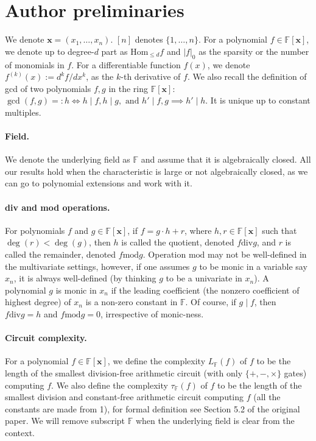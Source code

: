 \section*{Author preliminaries}
We denote $\mathbf x=(x_1,\ldots,x_n)$. $[n]$ denotes $\{1,\ldots,n\}$. For a polynomial $f\in\mathbb F[\mathbf x]$, we denote up to degree-$d$ part as $\mathrm{Hom}_{\le d}f$ and $|f|_0$ as the sparsity or the number of monomials in $f$. For a differentiable function $f(x)$, we denote $f^{(k)}(x):=d^kf/dx^k$, as the $k$-th derivative of $f$. We also recall the definition of gcd of two polynomials $f,g$ in the ring $\mathbb F[\mathbf x]$: $\gcd(f,g)=:h\iff h\mid f,h\mid g,\text{ and }h'\mid f,g\implies h'\mid h$. It is unique up to constant multiples.
\paragraph{Field.} We denote the underlying field as $\mathbb F$ and assume that it is algebraically closed. All our results hold when the characteristic is large or not algebraically closed, as we can go to polynomial extensions and work with it.
\paragraph{div and mod operations.} For polynomials $f$ and $g\in\mathbb F[\mathbf x]$, if $f=g\cdot h+r$, where $h,r\in\mathbb F[\mathbf x]$ such that $\deg(r)<\deg(g)$, then $h$ is called the quotient, denoted $f\mathbin{\mathrm{div}}g$, and $r$ is called the remainder, denoted $f\mathbin{\mathrm{mod}}g$. Operation $\mathrm{mod}$ may not be well-defined in the multivariate settings, however, if one assumes $g$ to be monic in a variable say $x_n$, it is always well-defined (by thinking $g$ to be a univariate in $x_n$). A polynomial $g$ is monic in $x_n$ if the leading coefficient (the nonzero coefficient of highest degree) of $x_n$ is a non-zero constant in $\mathbb F$. Of course, if $g\mid f$, then $f\mathbin{\mathrm{div}}g=h$ and $f\mathbin{\mathrm{mod}}g=0$, irrespective of monic-ness.
\paragraph{Circuit complexity.} For a polynomial $f\in\mathbb F[\mathbf x]$, we define the complexity $L_{\mathbb F}(f)$ of $f$ to be the length of the smallest division-free arithmetic circuit (with only $\{+,-,\times\}$ gates) computing $f$. We also define the complexity $\tau_{\mathbb F}(f)$ of $f$ to be the length of the smallest division and constant-free arithmetic circuit computing $f$ (all the constants are made from 1), for formal definition see Section 5.2 of the original paper. We will remove subscript $\mathbb F$ when the underlying field is clear from the context.
